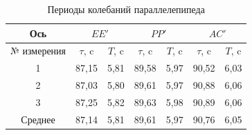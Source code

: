 \documentclass[a4paper, 12pt]{article}
\begin{document}
        \begin{table}
            \centering
            \caption{Периоды колебаний параллелепипеда}
            \begin{tabular}{|c|cc|cc|cc|}
                \hline
                Ось
                & \multicolumn{2}{c|}{$EE'$}
                & \multicolumn{2}{c|}{$PP'$}
                & \multicolumn{2}{c|}{$AC'$}
                \\
                \hline
                № измерения
                & \multicolumn{1}{c|}{$\tau$, c} & $T$, c
                & \multicolumn{1}{c|}{$\tau$, c} & $T$, c
                & \multicolumn{1}{c|}{$\tau$, c} & $T$, c \\
                \hline
                1
                & \multicolumn{1}{c|}{87,15} & 5,81
                & \multicolumn{1}{c|}{89,58} & 5,97
                & \multicolumn{1}{c|}{90,52} & 6,03 \\
                \hline
                2
                & \multicolumn{1}{c|}{87,03} & 5,80
                & \multicolumn{1}{c|}{89,61} & 5,97
                & \multicolumn{1}{c|}{90,88} & 6,06 \\
                \hline
                3
                & \multicolumn{1}{c|}{87,25} & 5,82
                & \multicolumn{1}{c|}{89,63} & 5,98
                & \multicolumn{1}{c|}{90,89} & 6,06 \\
                \hline
                Среднее
                & \multicolumn{1}{c|}{87,14} & 5,81
                & \multicolumn{1}{c|}{89,61} & 5,97
                & \multicolumn{1}{c|}{90,76} & 6,05 \\
                \hline
            \end{tabular}
        \end{table}
\end{document}
